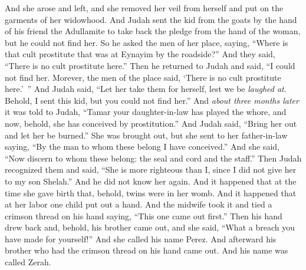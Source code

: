 \begin{biblechapter}
\verse And she arose and left, and she removed her veil from herself and put on the garments of her widowhood.
\verse And Judah sent the kid from the goats by the hand of his friend the Adullamite to take back the pledge from the hand of the woman, but he could not find her.
\verse So he asked the men of her place, saying, “Where is that cult prostitute that was at Eynayim by the roadside?” And they said, “There is no cult prostitute here.”
\verse Then he returned to Judah and said, “I could not find her. Morever, the men of the place said, ‘There is no cult prostitute here.’ ”
\verse And Judah said, “Let her take them for herself, lest we be \textit{laughed at}. Behold, I sent this kid, but you could not find her.”
\verse And \textit{about three months later} it was told to Judah, “Tamar your daughter-in-law has played the whore, and now, behold, she has conceived by prostitution.” And Judah said, “Bring her out and let her be burned.”
\verse She was brought out, but she sent to her father-in-law saying, “By the man to whom these belong I have conceived.” And she said, “Now discern to whom these belong: the seal and cord and the staff.”
\verse Then Judah recognized them and said, “She is more righteous than I, since I did not give her to my son Shelah.” And he did not know her again.
\verse And it happened that at the time she gave birth that, behold, twins were in her womb.
\verse And it happened that at her labor one child put out a hand. And the midwife took it and tied a crimson thread on his hand saying, “This one came out first.”
\verse Then his hand drew back and, behold, his brother came out, and she said, “What a breach you have made for yourself!” And she called his name Perez.
\verse And afterward his brother who had the crimson thread on his hand came out. And his name was called Zerah.
\end{biblechapter}

